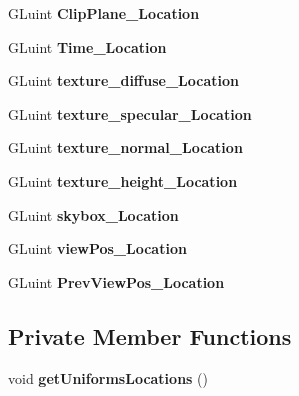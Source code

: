 \begin{DoxyCompactItemize}
\item 
G\+Luint {\bfseries Clip\+Plane\+\_\+\+Location}\hypertarget{class_shader_a81c91a6d87d2c77b0cba15512e9514ef}{}\label{class_shader_a81c91a6d87d2c77b0cba15512e9514ef}

\item 
G\+Luint {\bfseries Time\+\_\+\+Location}\hypertarget{class_shader_aad88a9b85b399cd38ce594a6889ab694}{}\label{class_shader_aad88a9b85b399cd38ce594a6889ab694}

\item 
G\+Luint {\bfseries texture\+\_\+diffuse\+\_\+\+Location}\hypertarget{class_shader_a4b71833d0bb0e1ec99b2c18cd3de8a72}{}\label{class_shader_a4b71833d0bb0e1ec99b2c18cd3de8a72}

\item 
G\+Luint {\bfseries texture\+\_\+specular\+\_\+\+Location}\hypertarget{class_shader_a8ef6edb7e817a32c2b1c168aa5ae7867}{}\label{class_shader_a8ef6edb7e817a32c2b1c168aa5ae7867}

\item 
G\+Luint {\bfseries texture\+\_\+normal\+\_\+\+Location}\hypertarget{class_shader_aa527a766bf9e53886e080101e61416f3}{}\label{class_shader_aa527a766bf9e53886e080101e61416f3}

\item 
G\+Luint {\bfseries texture\+\_\+height\+\_\+\+Location}\hypertarget{class_shader_ac8ed2d239a34287ac47f442710023339}{}\label{class_shader_ac8ed2d239a34287ac47f442710023339}

\item 
G\+Luint {\bfseries skybox\+\_\+\+Location}\hypertarget{class_shader_a4c11043c5d55de00bd732eb8bd49fd54}{}\label{class_shader_a4c11043c5d55de00bd732eb8bd49fd54}

\item 
G\+Luint {\bfseries view\+Pos\+\_\+\+Location}\hypertarget{class_shader_ac1d9dc73404fbe445e1d5070ec621378}{}\label{class_shader_ac1d9dc73404fbe445e1d5070ec621378}

\item 
G\+Luint {\bfseries Prev\+View\+Pos\+\_\+\+Location}\hypertarget{class_shader_aea650ed7a9ffc6e2f856c90cd5e8822b}{}\label{class_shader_aea650ed7a9ffc6e2f856c90cd5e8822b}

\end{DoxyCompactItemize}
\subsection*{Private Member Functions}
\begin{DoxyCompactItemize}
\item 
void {\bfseries get\+Uniforms\+Locations} ()\hypertarget{class_shader_a3138a0efd6b84443e8b992f6c9eefa25}{}\label{class_shader_a3138a0efd6b84443e8b992f6c9eefa25}

\end{DoxyCompactItemize}
